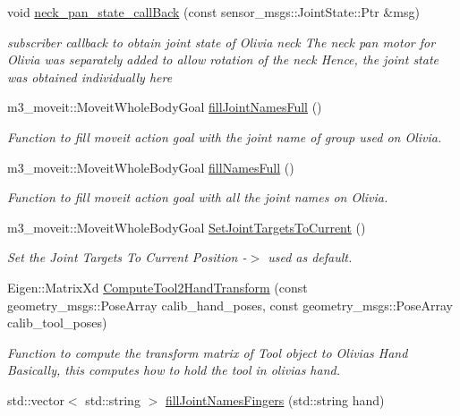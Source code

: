 \begin{DoxyCompactItemize}
void \hyperlink{structManipulate_a0fd9ffe9c66fd0927721c77a6a390e67}{neck\+\_\+pan\+\_\+state\+\_\+call\+Back} (const sensor\+\_\+msgs\+::\+Joint\+State\+::\+Ptr \&msg)
\begin{DoxyCompactList}\small\item\em subscriber callback to obtain joint state of Olivia neck The neck pan motor for Olivia was separately added to allow rotation of the neck Hence, the joint state was obtained individually here \end{DoxyCompactList}\item 
m3\+\_\+moveit\+::\+Moveit\+Whole\+Body\+Goal \hyperlink{structManipulate_aaf8eadf2c5afb08213485c6bd9327fac}{fill\+Joint\+Names\+Full} ()
\begin{DoxyCompactList}\small\item\em Function to fill moveit action goal with the joint name of group used on Olivia. \end{DoxyCompactList}\item 
m3\+\_\+moveit\+::\+Moveit\+Whole\+Body\+Goal \hyperlink{structManipulate_a561688c2810b273b969b9bc8594bcac3}{fill\+Names\+Full} ()
\begin{DoxyCompactList}\small\item\em Function to fill moveit action goal with all the joint names on Olivia. \end{DoxyCompactList}\item 
m3\+\_\+moveit\+::\+Moveit\+Whole\+Body\+Goal \hyperlink{structManipulate_a1c91c2b91d2012652f62071e45899a21}{Set\+Joint\+Targets\+To\+Current} ()
\begin{DoxyCompactList}\small\item\em Set the Joint Targets To Current Position -\/$>$ used as default. \end{DoxyCompactList}\item 
Eigen\+::\+Matrix\+Xd \hyperlink{structManipulate_aadbaa24ccd292595a3821155f2bb8b99}{Compute\+Tool2\+Hand\+Transform} (const geometry\+\_\+msgs\+::\+Pose\+Array calib\+\_\+hand\+\_\+poses, const geometry\+\_\+msgs\+::\+Pose\+Array calib\+\_\+tool\+\_\+poses)
\begin{DoxyCompactList}\small\item\em Function to compute the transform matrix of Tool object to Olivia\textquotesingle{}s Hand Basically, this computes how to hold the tool in olivia\textquotesingle{}s hand. \end{DoxyCompactList}\item 
std\+::vector$<$ std\+::string $>$ \hyperlink{structManipulate_a08707bdbba233e0375b6d79b69c413da}{fill\+Joint\+Names\+Fingers} (std\+::string hand)

\end{DoxyCompactItemize}
